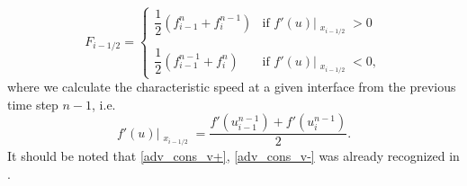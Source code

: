 \documentclass[../include.tex]{subfiles}
\begin{document}
\begin{equation}
	F_{i - 1/2} = 
\begin{cases}
	\label{flux_iioe}
	\dfrac{1}{2}\left(f^n_{i-1} + f^{n-1}_{i}\right) &  \text{if } f'(u)\big|_{\substack{x_{i-1/2}}} > 0\\
	\\
	\dfrac{1}{2}\left(f^{n-1}_{i-1} + f^{n}_{i}\right) &  \text{if } f'(u)\big|_{\substack{x_{i-1/2}}} < 0,
\end{cases}
\end{equation}
where we calculate the characteristic speed at a given interface from the previous time step $ n-1 $, i.e.\
\begin{equation}
	\label{iioe_char_speed}
	f'(u)\big|_{\substack{x_{i-1/2}}} = \frac{f'(u_{i-1}^{n-1}) + f'(u_{i}^{n-1})}{2}.
\end{equation}
It should be noted that \eqref{adv_cons_v+}, \eqref{adv_cons_v-} was already recognized in \cite{iioe2012, iioe2}.
\end{document}
